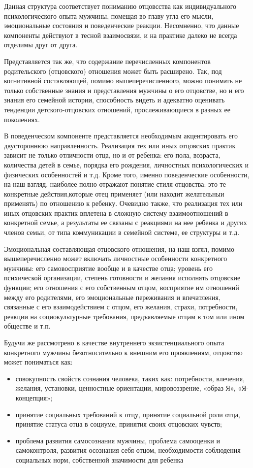 \documentclass{../../common/thesisbyxetex}
\begin{document}
Данная структура соответствует пониманию отцовсства как индивидуального психологического опыта
мужчины, помещая во главу угла его мысли, эмоциональные состояния и поведенческие реакции.
Несомненно, что данные компоненты действуют в тесной взаимосвязи, и на практике далеко не всегда
отделимы друг от друга.

Представляется так же, что содержание перечисленных компонентов родительского (отцовского)
отношения может быть расширено. Так, под когнитивной составляющей, помимо вышеперечисленного, можно
понимать не только собственные знания и представления мужчины о его отцовстве, но и его
знания его семейной истории, способность видеть и адекватно оценивать тенденции детского-отцовских
отношений, прослеживающиеся в разных ее поколениях.

В поведенческом компоненте
представляется необходимым акцентировать его двустороннюю направленность. Реализация тех или иных
отцовских практик зависит не только отличности отца, но и от ребенка: его пола, возраста, количества
детей в семье, порядка его рождения, личностных психологических и физических особенностей и т.д.
Кроме того, именно поведенческие особенности, на наш взгляд, наиболее полно отражают понятие
стиля отцовства: это те конкретные действия,которые отец применяет (или находит желательныи
применять) по отношению к ребенку. Очевидно также, что реализация тех или иных отцовских практик
вплетена в
сложную систему взаимоотношений в конкретной семье, а результаты ее связаны с реакциями на
нее ребенка и других членов семьи, от типа коммуникации в семейной системе, ее структуры и т.д.

Эмоциональная составляющая отцовского отношения, на наш взгял, помимо вышеперечисленно может
включать личностные особенности конкретного мужчины: его самовосприятие вообще и в качестве отца;
уровень его психической организации, степень готовности и желания исполнять отцовские функции;
его отношения с его собственным отцом, восприятие им отношений между его родителями, его
эмоциональные переживания и впечатления, связанные с его взаимодействием с отцом, его желания,
страхи, потребности, реакции на социокультурные требования, предъявляемые отцам в том или ином
обществе и т.п.

Будучи же рассмотрено в качестве внутреннего экзистенциального опыта
конкретного мужчины безотносительно к внешним его проявлениям, отцовство может пониматься как:

\begin{itemize}
	\item  совокупность свойств сознания человека, таких
как: потребности, влечения, желания, установки, ценностные ориентации,
мировоззрение, «образ Я», «Я-концепция»;

\item принятие социальных требований к отцу, принятие социальной роли отца, принятие статуса отца в
социуме, принятия своих отцовских чувств;

\item проблема развития самосознания мужчины, проблема самооценки и самоконтроля, развития осознания
себя отцом, необходимости соблюдения социальных норм, собственной значимости для ребенка
\cite{psyot}
\end{itemize}
\end{document}
